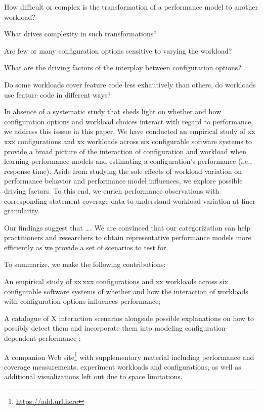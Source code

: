 \begin{compactitem}
	\item How difficult or complex is the transformation of a performance model to another workload? 
	\item What drives complexity in such transformations? 
	\item Are few or many configuration options sensitive to varying the workload?
	\item What are the driving factors of the interplay between configuration options? 
	\item Do some workloads cover feature code less exhautively than others, do workloads use feature code in different ways?
\end{compactitem}

In absence of a systematic study that sheds light on whether and how configuration options and workload choices interact with regard to performance, we address this isssue in this paper. 
We have conducted an empirical study of {\color{red}xx\,xxx} configurations and {\color{red}xx} workloads across six configurable software systems to provide a broad picture of the interaction of configuration and workload when learning performance models and estimating a configuration's performance (i.e., response time). Aside from studying the sole effects of workload variation on performance behavior and performance model influences, we explore possible driving factors. To this end, we enrich performance observations with corresponding statement coverage data to understand workload variation at finer granularity.

Our findings suggest that {\color{red} \ldots. We are convinced that our categorization can help practitioners and researchers to obtain representative performance models more efficiently as we provide a set of scenarios to test for.}

To summarize, we make the following contributions: 

\begin{compactitem}
	\item An empirical study of {\color{red}xx\,xxx} configurations and {\color{red}xx} workloads across six configurable software systems of whether and how the interaction of workloads with configuration options influences performance;
	
	\item A catalogue of {\color{red}X} interaction scenarios alongside possible explanations on how to possibly detect them and incorporate them into modeling configuration-dependent performance	;
	
	\item A companion Web site\footnote{\url{https://add.url.here}} with supplementary material including performance and coverage measurements, experiment workloads and configurations, as well as additional visualizations left out due to space limitations.
\end{compactitem}


